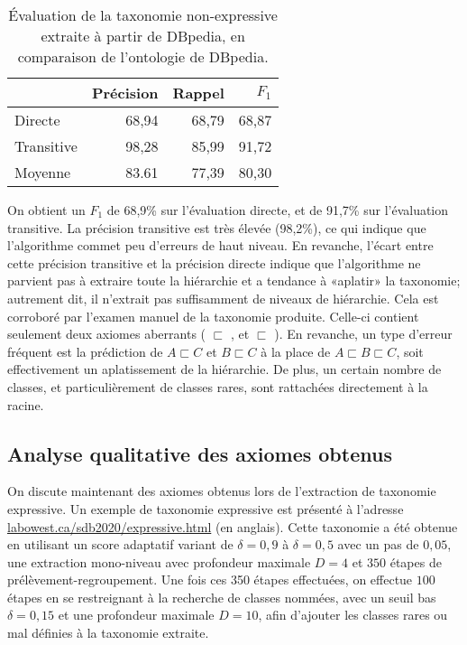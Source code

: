 \begin{table}[h]
    \centering
    \caption[Évaluation de la taxonomie non-expressive extraite sur DBpedia]{Évaluation de la taxonomie non-expressive extraite à partir de DBpedia, en comparaison de l'ontologie de DBpedia.}
    \begin{tabular}{|lrrr|}
        \hline
             & Précision  & Rappel & $F_1$ \\
        \hline
        Directe   &	68,94	&	68,79	&	68,87 \\
        Transitive  &	98,28	&	85,99	&	91,72 \\
        Moyenne & 83.61 & 77,39 & 80,30 \\
        \hline
    \end{tabular}
    \label{tab:extraction-results}
\end{table}

On obtient un $F_1$ de 68,9\% sur l'évaluation directe, et de 91,7\% sur l'évaluation transitive. La précision transitive est très élevée (98,2\%), ce qui indique que l'algorithme commet peu d'erreurs de haut niveau. En revanche, l'écart entre cette précision transitive et la précision directe indique que l'algorithme ne parvient pas à extraire toute la hiérarchie et a tendance à «aplatir» la taxonomie; autrement dit, il n'extrait pas suffisamment de niveaux de hiérarchie. Cela est corroboré par l'examen manuel de la taxonomie produite. Celle-ci contient seulement deux axiomes aberrants ( $\sqsubset$ , et  $\sqsubset$ ). En revanche, un type d'erreur fréquent est la prédiction de $A \sqsubset C$ et $B \sqsubset C$ à la place de $A \sqsubset B \sqsubset C$, soit effectivement un aplatissement de la hiérarchie. De plus, un certain nombre de classes, et particulièrement de classes rares, sont rattachées directement à la racine.




\subsection{Analyse qualitative des axiomes obtenus}
\label{subsec:texp-reslts-quali}

On discute maintenant des axiomes obtenus lors de l'extraction de taxonomie expressive. Un exemple de taxonomie expressive est présenté à l'adresse \href{http://labowest.ca/sdb2020/expressive.html}{labowest.ca/sdb2020/expressive.html} (en anglais). Cette taxonomie a été obtenue en utilisant un score adaptatif variant de $\delta = 0,9$ à $\delta = 0,5$ avec un pas de $0,05$, une extraction mono-niveau avec profondeur maximale $D=4$ et $350$ étapes de prélèvement-regroupement. Une fois ces 350 étapes effectuées, on effectue $100$ étapes en se restreignant à la recherche de classes nommées, avec un seuil bas $\delta = 0,15$ et une profondeur maximale $D=10$, afin d'ajouter les classes rares ou mal définies à la taxonomie extraite.


